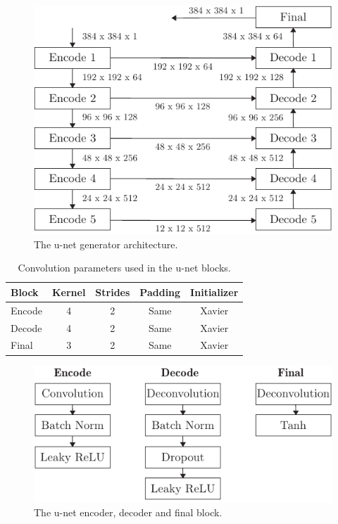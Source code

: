 \begin{figure}[h]
  \centering
  \includegraphics[width=\linewidth]{figure/unet-arch.pdf}
  \caption{The u-net generator architecture.
	}\label{fig:unet:arch}
\end{figure}
\begin{table}[h]
  \centering
  \begin{tabular}{lcccc}
    \toprule
    Block & Kernel & Strides & Padding & Initializer \\
    \midrule
    Encode & \num{4} & \num{2} & Same & Xavier \\
    Decode & \num{4} & \num{2} & Same & Xavier \\
    Final  & \num{3} & \num{2} & Same & Xavier \\
    \bottomrule
  \end{tabular}
  \caption{Convolution parameters used in the u-net blocks.
  }\label{tab:unet:conv}
\end{table}
\begin{figure}[h]
  \centering
  \includegraphics[width=\linewidth]{figure/unet-block.pdf}
  \caption{The u-net encoder, decoder and final block.
	}\label{fig:unet:block}
\end{figure}


